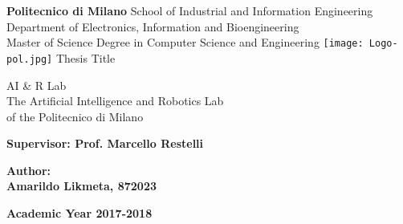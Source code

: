 \begin{titlepage}
    \begin{center}
        \vspace*{1cm}
        
        \Huge
        \textbf{Politecnico di Milano}
        \large
        School of Industrial and Information Engineering\\
		Department of Electronics, Information and Bioengineering\\
		Master of Science Degree in Computer Science and Engineering
        \vspace*{0.5cm}
        \texttt{[image: Logo-pol.jpg]}
        \LARGE
        Thesis Title
        
        \vspace*{1cm}
        AI & R Lab\\
		The Artificial Intelligence and Robotics Lab\\
		of the Politecnico di Milano
        
        \vspace*{2cm}
    \end{center}
    
   \textbf{Supervisor: Prof. Marcello Restelli}\\
 \begin{flushright}
 \textbf{Author:}\\
 \textbf{Amarildo Likmeta, 872023}
 \end{flushright}
 \begin{center}
 \textbf{Academic Year 2017-2018}
 \end{center}
\end{titlepage}